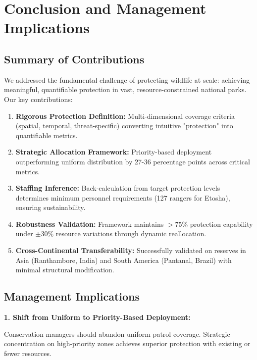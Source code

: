 \section{Conclusion and Management Implications}

\subsection{Summary of Contributions}

We addressed the fundamental challenge of protecting wildlife at scale: achieving meaningful, quantifiable protection in vast, resource-constrained national parks. Our key contributions:

\begin{enumerate}
\item \textbf{Rigorous Protection Definition:} Multi-dimensional coverage criteria (spatial, temporal, threat-specific) converting intuitive "protection" into quantifiable metrics.

\item \textbf{Strategic Allocation Framework:} Priority-based deployment outperforming uniform distribution by 27-36 percentage points across critical metrics.

\item \textbf{Staffing Inference:} Back-calculation from target protection levels determines minimum personnel requirements (127 rangers for Etosha), ensuring sustainability.

\item \textbf{Robustness Validation:} Framework maintains $>$75\% protection capability under $\pm$30\% resource variations through dynamic reallocation.

\item \textbf{Cross-Continental Transferability:} Successfully validated on reserves in Asia (Ranthambore, India) and South America (Pantanal, Brazil) with minimal structural modification.
\end{enumerate}

\subsection{Management Implications}

\noindent \textbf{1. Shift from Uniform to Priority-Based Deployment:}

Conservation managers should abandon uniform patrol coverage. Strategic concentration on high-priority zones achieves superior protection with existing or fewer resources.

